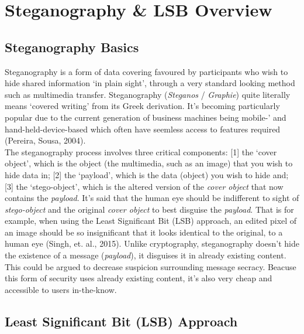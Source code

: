 \documentclass[11pt, english]{article}
\begin{document}
\newpage

\section{Steganography \& LSB Overview}

	\subsection{Steganography Basics}

	Steganography is a form of data covering favoured by participants who wish to hide shared information `in plain sight', through a very standard looking method such as multimedia transfer. Steganography (\textsl{Steganos} / \textsl{Graphie}) quite literally means `covered writing' from its Greek derivation. It's becoming particularly popular due to the current generation of business machines being mobile-' and hand-held-device-based which often have seemless access to features required (Pereira, Sousa, 2004).\\

	The steganography process involves three critical components: [1] the `cover object', which is the object (the multimedia, such as an image) that you wish to hide data in; [2] the `payload', which is the data (object) you wish to hide and; [3] the `stego-object', which is the altered version of the \textit{cover object} that now contains the \textit{payload}. It's said that the human eye should be indifferent to sight of \textit{stego-object} and the original \textit{cover object} to best disguise the \textit{payload}. That is for example, when using the Least Significant Bit (LSB) approach, an edited pixel of an image should be so insignificant that it looks identical to the original, to a human eye (Singh, et. al., 2015). Unlike cryptography, steganography doesn't hide the existence of a message (\textit{payload}), it disguises it in already existing content. This could be argued to decrease suspicion surrounding message secracy. Beacuse this form of security uses already existing content, it's also very cheap and accessible to users in-the-know.

	\subsection{Least Significant Bit (LSB) Approach}
\end{document}
